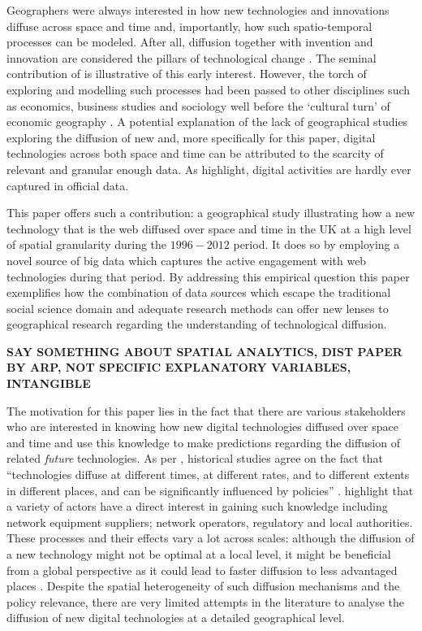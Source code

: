 \documentclass[
  authoryear,
  preprint,
  3p]{elsarticle}
\begin{document}
Geographers were always interested in how new technologies and
innovations diffuse across space and time and, importantly, how such
spatio-temporal processes can be modeled. After all, diffusion together
with invention and innovation are considered the pillars of
technological change \citep{das2022diffusion}. The seminal contribution
of \citet{hagerstrand1968innovation} is illustrative of this early
interest. However, the torch of exploring and modelling such processes
had been passed to other disciplines such as economics, business studies
and sociology well before the `cultural turn' of economic geography
\citep{perkins2005international}. A potential explanation of the lack of
geographical studies exploring the diffusion of new and, more
specifically for this paper, digital technologies across both space and
time can be attributed to the scarcity of relevant and granular enough
data. As \citet{zook2022mapping} highlight, digital activities are
hardly ever captured in official data.

This paper offers such a contribution: a geographical study illustrating
how a new technology that is the web diffused over space and time in the
UK at a high level of spatial granularity during the \(1996-2012\)
period. It does so by employing a novel source of big data which
captures the active engagement with web technologies during that period.
By addressing this empirical question this paper exemplifies how the
combination of data sources which escape the traditional social science
domain and adequate research methods can offer new lenses to
geographical research regarding the understanding of technological
diffusion.

\textbf{SAY SOMETHING ABOUT SPATIAL ANALYTICS, DIST PAPER BY ARP, NOT
SPECIFIC EXPLANATORY VARIABLES, INTANGIBLE}

The motivation for this paper lies in the fact that there are various
stakeholders who are interested in knowing how new digital technologies
diffused over space and time and use this knowledge to make predictions
regarding the diffusion of related \emph{future} technologies. As per
\citet{leibowicz2016representing}, historical studies agree on the fact
that ``technologies diffuse at different times, at different rates, and
to different extents in different places, and can be significantly
influenced by policies'' \citep{victor1993}. \citet{meade2021modelling}
highlight that a variety of actors have a direct interest in gaining
such knowledge including network equipment suppliers; network operators,
regulatory and local authorities. These processes and their effects vary
a lot across scales: although the diffusion of a new technology might
not be optimal at a local level, it might be beneficial from a global
perspective as it could lead to faster diffusion to less advantaged
places \citep{leibowicz2016representing}. Despite the spatial
heterogeneity of such diffusion mechanisms and the policy relevance,
there are very limited attempts in the literature to analyse the
diffusion of new digital technologies at a detailed geographical level.
\end{document}
